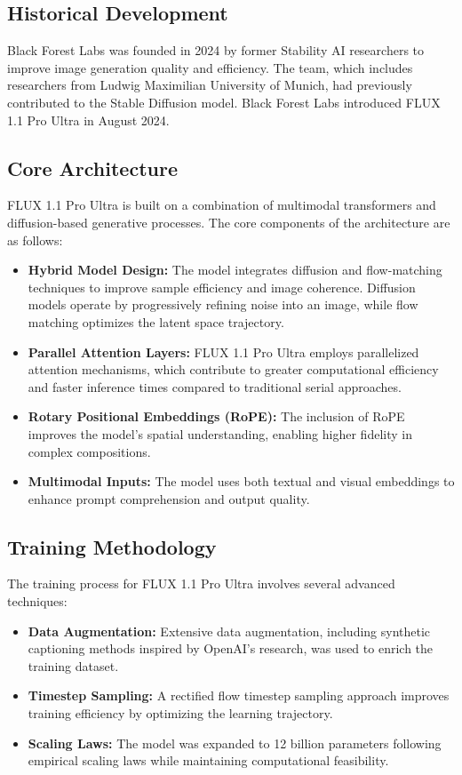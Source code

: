 \subsection{Historical Development}
Black Forest Labs was founded in 2024 by former Stability AI researchers to improve image generation quality and efficiency. The team, which includes researchers from Ludwig Maximilian University of Munich, had previously contributed to the Stable Diffusion model. Black Forest Labs introduced FLUX 1.1 Pro Ultra in August 2024.

\subsection{Core Architecture}
FLUX 1.1 Pro Ultra is built on a combination of multimodal transformers and diffusion-based generative processes. The core components of the architecture are as follows:

\begin{itemize}
    \item \textbf{Hybrid Model Design:} The model integrates diffusion and flow-matching techniques to improve sample efficiency and image coherence. Diffusion models operate by progressively refining noise into an image, while flow matching optimizes the latent space trajectory.
    \item \textbf{Parallel Attention Layers:} FLUX 1.1 Pro Ultra employs parallelized attention mechanisms, which contribute to greater computational efficiency and faster inference times compared to traditional serial approaches.
    \item \textbf{Rotary Positional Embeddings (RoPE):} The inclusion of RoPE improves the model's spatial understanding, enabling higher fidelity in complex compositions.
    \item \textbf{Multimodal Inputs:} The model uses both textual and visual embeddings to enhance prompt comprehension and output quality.
\end{itemize}

\subsection{Training Methodology}
The training process for FLUX 1.1 Pro Ultra involves several advanced techniques:

\begin{itemize}
    \item \textbf{Data Augmentation:} Extensive data augmentation, including synthetic captioning methods inspired by OpenAI's research, was used to enrich the training dataset.
    \item \textbf{Timestep Sampling:} A rectified flow timestep sampling approach improves training efficiency by optimizing the learning trajectory.
    \item \textbf{Scaling Laws:} The model was expanded to 12 billion parameters following empirical scaling laws while maintaining computational feasibility.
\end{itemize}

